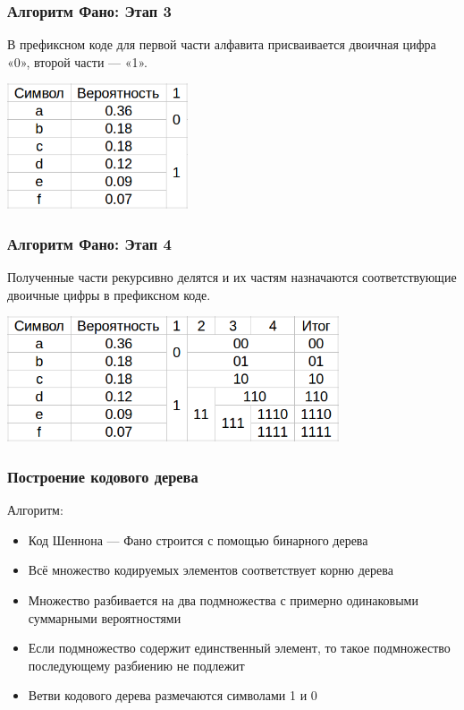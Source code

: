 \documentclass[10pt,pdf,hyperref={unicode}]{beamer}
\begin{document}
\begin{frame}
	\frametitle{Алгоритм Фано: Этап 3}
	В префиксном коде для первой части алфавита 
	присваивается двоичная цифра «0», второй части — «1».
	
	\vspace{1em}
	\includegraphics[height=10em]{alg2.png}
\end{frame}

\begin{frame}
	\frametitle{Алгоритм Фано: Этап 4}
	Полученные части рекурсивно делятся и их частям назначаются соответствующие 
	двоичные цифры в префиксном коде.
	
	\vspace{1em}
	\includegraphics[height=10em]{alg3.png}
\end{frame}

\begin{frame}
	\frametitle{Построение кодового дерева}
	Алгоритм:
	\begin{itemize}
		\item Код Шеннона — Фано строится с помощью бинарного дерева
		\item Всё множество кодируемых элементов соответствует корню дерева
		\item Множество разбивается на два подмножества с примерно одинаковыми 
			суммарными вероятностями
		\item Если подмножество содержит единственный элемент, то такое 
			подмножество последующему разбиению не подлежит
		\item Ветви кодового дерева размечаются символами 1 и 0
	\end{itemize}
\end{frame}
\end{document}
